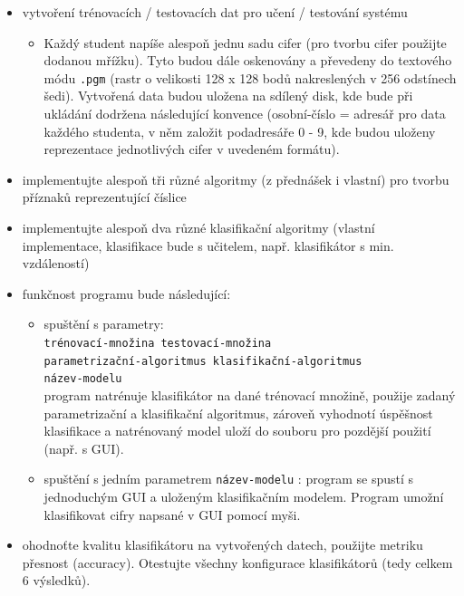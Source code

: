 \documentclass[12pt]{article}
\begin{document}
\begin{itemize}
\item vytvoření trénovacích / testovacích dat pro učení / testování systému
\begin{itemize}
\item Každý student napíše alespoň jednu sadu cifer (pro tvorbu cifer použijte dodanou mřížku). Tyto budou dále oskenovány a převedeny do textového módu \texttt{.pgm} (rastr o velikosti 128 x 128 bodů nakreslených v 256 odstínech šedi). Vytvořená data budou uložena na sdílený disk, kde bude při ukládání dodržena následující konvence (osobní-číslo = adresář pro data každého studenta, v něm založit podadresáře 0 - 9, kde budou uloženy reprezentace jednotlivých cifer v uvedeném formátu). 
\end{itemize}

\item implementujte alespoň tři různé algoritmy (z přednášek i vlastní) pro tvorbu příznaků reprezentující číslice

\item implementujte alespoň dva různé klasifikační algoritmy (vlastní implementace, klasifikace bude s učitelem, např. klasifikátor s min. vzdáleností)

\item funkčnost programu bude následující:

\begin{itemize}
\item spuštění s parametry:
\\ \texttt{trénovací-množina testovací-množina 
\\parametrizační-algoritmus klasifikační-algoritmus 
\\název-modelu}\\
program natrénuje klasifikátor na dané trénovací množině, použije zadaný parametrizační a klasifikační algoritmus, zároveň vyhodnotí úspěšnost klasifikace a natrénovaný model uloží do souboru pro pozdější použití (např. s GUI).

\item spuštění s jedním parametrem \texttt{název-modelu} : program se spustí s jednoduchým GUI a uloženým klasifikačním modelem. Program umožní klasifikovat cifry napsané v GUI pomocí myši.
\end{itemize}

\item ohodnoťte kvalitu klasifikátoru na vytvořených datech, použijte metriku přesnost (accuracy). Otestujte všechny konfigurace klasifikátorů (tedy celkem 6 výsledků).

\end{itemize}
\end{document}
